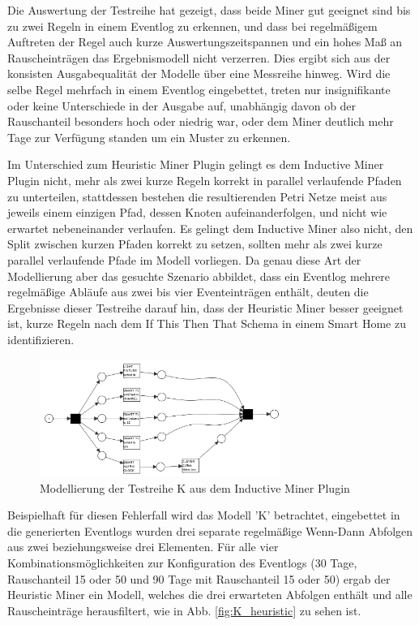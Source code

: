 Die Auswertung der Testreihe hat gezeigt, dass beide Miner gut geeignet sind bis zu zwei Regeln in einem Eventlog zu erkennen, und dass bei regelmäßigem Auftreten der Regel auch kurze Auswertungszeitspannen und ein hohes Maß an Rauscheinträgen das Ergebnismodell nicht verzerren. Dies ergibt sich aus der konsisten Ausgabequalität der Modelle über eine Messreihe hinweg. Wird die selbe Regel mehrfach in einem Eventlog eingebettet, treten nur insignifikante oder keine Unterschiede in der Ausgabe auf, unabhängig davon ob der Rauschanteil besonders hoch oder niedrig war, oder dem Miner deutlich mehr Tage zur Verfügung standen um ein Muster zu erkennen.

Im Unterschied zum Heuristic Miner Plugin gelingt es dem Inductive Miner Plugin nicht, mehr als zwei kurze Regeln korrekt in parallel verlaufende Pfaden zu unterteilen, stattdessen bestehen die resultierenden Petri Netze meist aus jeweils einem einzigen Pfad, dessen Knoten aufeinanderfolgen, und nicht wie erwartet nebeneinander verlaufen. Es gelingt dem Inductive Miner also nicht, den Split zwischen kurzen Pfaden korrekt zu setzen, sollten mehr als zwei kurze parallel verlaufende Pfade im Modell vorliegen. Da genau diese Art der Modellierung aber das gesuchte Szenario abbildet, dass ein Eventlog mehrere regelmäßige Abläufe aus zwei bis vier Eventeinträgen enthält, deuten die Ergebnisse dieser Testreihe darauf hin, dass der Heuristic Miner besser geeignet ist, kurze Regeln nach dem If This Then That Schema in einem Smart Home zu identifizieren.
\begin{figure}[!ht]
    \centering
    \includegraphics[width=0.7\textwidth,]{figures/Appbildungen/K_inductive_erronousPNG.PNG}
    \caption{Modellierung der Testreihe K aus dem Inductive Miner Plugin}
    \label{fig:K_inductive}
\end{figure}
Beispielhaft für diesen Fehlerfall wird das Modell 'K' betrachtet, eingebettet in die generierten Eventlogs wurden drei separate regelmäßige Wenn-Dann Abfolgen aus zwei beziehungsweise drei Elementen. Für alle vier Kombinationsmöglichkeiten zur Konfiguration des Eventlogs (30 Tage, Rauschanteil 15 oder 50 und 90 Tage mit Rauschanteil 15 oder 50) ergab der Heuristic Miner ein Modell, welches die drei erwarteten Abfolgen enthält und alle Rauscheinträge herausfiltert, wie in Abb. \ref{fig:K_heuristic} zu sehen ist.
